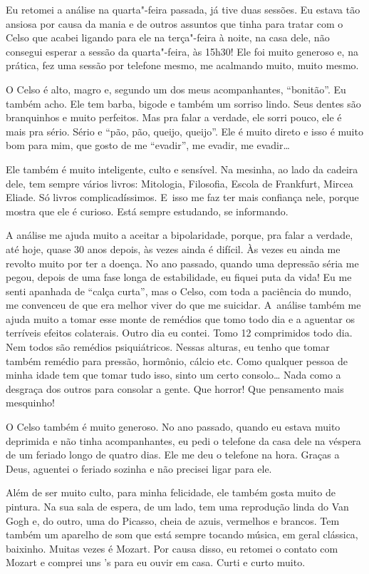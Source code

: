 Eu retomei a análise na quarta"-feira passada, já tive duas sessões. Eu
estava tão ansiosa por causa da mania e de outros assuntos que tinha
para tratar com o Celso que acabei ligando para ele na terça"-feira à
noite, na casa dele, não consegui esperar a sessão da quarta"-feira, às
15h30! Ele foi muito generoso e, na prática, fez uma sessão por telefone
mesmo, me acalmando muito, muito mesmo.

O Celso é alto, magro e, segundo um dos meus acompanhantes, ``bonitão''.
Eu também acho. Ele tem barba, bigode e também um sorriso lindo. Seus
dentes são branquinhos e muito perfeitos. Mas pra falar a verdade, ele
sorri pouco, ele é mais pra sério. Sério e ``pão, pão, queijo, queijo''.
Ele é muito direto e isso é muito bom para mim, que gosto de me
``evadir'', me evadir, me evadir…

Ele também é muito inteligente, culto e sensível. Na mesinha, ao lado da
cadeira dele, tem sempre vários livros: Mitologia, Filosofia, Escola de
Frankfurt, Mircea Eliade. Só livros complicadíssimos. E~isso me faz ter
mais confiança nele, porque mostra que ele é curioso. Está sempre
estudando, se informando.

A análise me ajuda muito a aceitar a bipolaridade, porque, pra falar a
verdade, até hoje, quase 30 anos depois, às vezes ainda é difícil. Às
vezes eu ainda me revolto muito por ter a doença. No ano passado, quando
uma depressão séria me pegou, depois de uma fase longa de estabilidade,
eu fiquei puta da vida! Eu me senti apanhada de ``calça curta'', mas o
Celso, com toda a paciência do mundo, me convenceu de que era melhor
viver do que me suicidar. A~análise também me ajuda muito a tomar esse
monte de remédios que tomo todo dia e a aguentar os terríveis efeitos
colaterais. Outro dia eu contei. Tomo 12 comprimidos todo dia. Nem todos
são remédios psiquiátricos. Nessas alturas, eu tenho que tomar também
remédio para pressão, hormônio, cálcio etc. Como qualquer pessoa de minha
idade tem que tomar tudo isso, sinto um certo consolo… Nada como
a desgraça dos outros para consolar a gente. Que horror! Que
pensamento mais mesquinho!

O Celso também é muito generoso. No ano passado, quando eu estava muito
deprimida e não tinha acompanhantes, eu pedi o telefone da casa dele na
véspera de um feriado longo de quatro dias. Ele me deu o telefone na
hora. Graças a Deus, aguentei o feriado sozinha e não precisei ligar
para ele.

Além de ser muito culto, para minha felicidade, ele também gosta muito
de pintura. Na sua sala de espera, de um lado, tem uma reprodução linda
do Van Gogh e, do outro, uma do Picasso, cheia de azuis, vermelhos e
brancos. Tem também um aparelho de som que está sempre tocando música,
em geral clássica, baixinho. Muitas vezes é Mozart. Por causa disso, eu
retomei o contato com Mozart e comprei uns 's para eu ouvir em casa.
Curti e curto muito.

